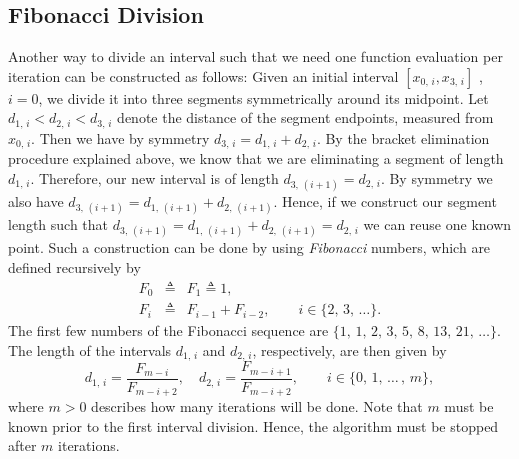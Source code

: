 \subsection{Fibonacci Division}
Another way to divide an interval such that we need one function evaluation per iteration can be constructed as follows: Given an initial interval $[x_{0, \, i}, x_{3, \, i}]$ , $i=0$, we divide it into three segments symmetrically around its midpoint. Let $d_{1,\, i} < d_{2,\, i} < d_{3,\, i}$ denote the distance of the segment endpoints, measured from $x_{0, \,i}$. Then we have by symmetry $d_{3,\, i}=d_{1,\, i} + d_{2,\, i}$. By the bracket elimination procedure explained above, we know that we are eliminating a segment of length $d_{1,\, i}$. Therefore, our new interval is of length $d_{3,\, (i+1)}= d_{2,\, i}$. By symmetry we also have $d_{3,\, (i+1)}= d_{1,\, (i+1)} + d_{2,\, (i+1)}$. Hence, if we construct our segment length such that $d_{3,\, (i+1)} = d_{1,\, (i+1)} + d_{2,\, (i+1)}= d_{2,\, i}$ we can reuse one known point. Such a construction can be done by using \emph{Fibonacci} numbers, which are defined recursively by
\begin{subequations}
\begin{eqnarray}
  F_0 & \triangleq & F_1 \triangleq 1, \\
  F_i & \triangleq & F_{i-1} + F_{i-2}, \qquad i \in \{2, \, 3, \, \ldots \}.
\end{eqnarray}
\end{subequations}
The first few numbers of the Fibonacci sequence are $\{1, \, 1, \,  2, \, 3, \, 5, \, 8, \, 13, \, 21, \, \ldots \}$. The length of the intervals $d_{1,\, i}$ and $d_{2, \, i}$, respectively, are then given by
\begin{equation}
   d_{1, \, i} = \frac{F_{m-i} }{ F_{m-i+2} }, \quad
  d_{2, \, i} = \frac{F_{m-i+1} }{ F_{m-i+2} }, \qquad
  i \in \{0, \, 1, \, \ldots \, , \, m \},
\end{equation}
where $m > 0 $ describes how many iterations will be done. Note that $m$ must be known prior to the first interval division. 
Hence, the algorithm must be stopped after $m$ iterations.\\

